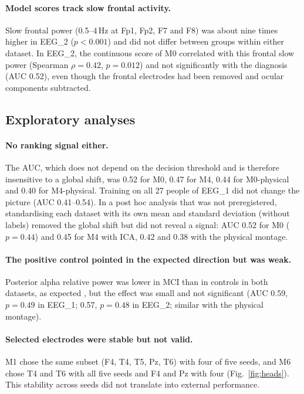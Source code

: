 \paragraph{Model scores track slow frontal activity.} Slow frontal power (0.5--4\,Hz at Fp1, Fp2, F7 and F8) was about nine times higher in EEG\_2 ($p<0.001$) and did not differ between groups within either dataset. In EEG\_2, the continuous score of M0 correlated with this frontal slow power (Spearman $\rho=0.42$, $p=0.012$) and not significantly with the diagnosis (AUC 0.52), even though the frontal electrodes had been removed and ocular components subtracted.

\subsection{Exploratory analyses}

\paragraph{No ranking signal either.} The AUC, which does not depend on the decision threshold and is therefore insensitive to a global shift, was 0.52 for M0, 0.47 for M4, 0.44 for M0-physical and 0.40 for M4-physical. Training on all 27 people of EEG\_1 did not change the picture (AUC 0.41--0.54). In a post hoc analysis that was not preregistered, standardising each dataset with its own mean and standard deviation (without labels) removed the global shift but did not reveal a signal: AUC 0.52 for M0 ($p=0.44$) and 0.45 for M4 with ICA, 0.42 and 0.38 with the physical montage.

\paragraph{The positive control pointed in the expected direction but was weak.} Posterior alpha relative power was lower in MCI than in controls in both datasets, as expected \citep{babiloni2015}, but the effect was small and not significant (AUC 0.59, $p=0.49$ in EEG\_1; 0.57, $p=0.48$ in EEG\_2; similar with the physical montage).

\paragraph{Selected electrodes were stable but not valid.} M1 chose the same subset (F4, T4, T5, Pz, T6) with four of five seeds, and M6 chose T4 and T6 with all five seeds and F4 and Pz with four (Fig.~\ref{fig:heads}). This stability across seeds did not translate into external performance.

